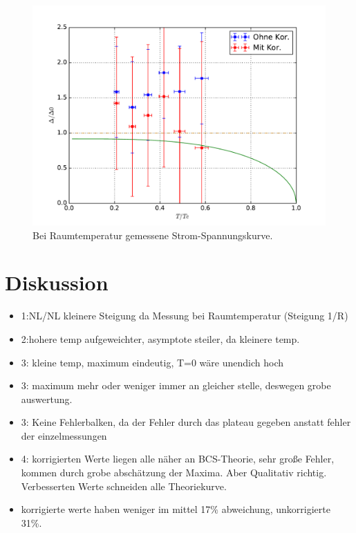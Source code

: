 \documentclass[twoside,        %
               BCOR12mm,       %
               english,ngerman, %
               fleqn,headsepline=false,footsepline=false
              ]{Vorlage/MFPREPORT}
\begin{document}
\begin{figure}[]
    \centering
    \includegraphics[width=\textwidth]{fig/4.pdf}
    \caption{Bei Raumtemperatur gemessene Strom-Spannungskurve.}
    \label{fig:4}
\end{figure}


\section{Diskussion}

\begin{itemize}
    \item 1:NL/NL kleinere Steigung da Messung bei Raumtemperatur (Steigung 1/R)
    \item 2:hohere temp aufgeweichter, asymptote steiler, da kleinere temp.
    \item 3: kleine temp, maximum eindeutig, T=0 wäre unendich hoch
    \item 3: maximum mehr oder weniger immer an gleicher stelle, deswegen grobe
        auswertung.
    \item 3: Keine Fehlerbalken, da der Fehler durch das plateau gegeben
        anstatt fehler der einzelmessungen
    \item 4: korrigierten Werte liegen alle näher an BCS-Theorie, sehr große
        Fehler, kommen durch grobe abschätzung der Maxima. Aber Qualitativ
        richtig. Verbesserten Werte schneiden alle Theoriekurve.
    \item korrigierte werte haben weniger im mittel 17\% abweichung,
        unkorrigierte 31\%.
\end{itemize}

\clearpage

%
%
%
%



\end{document}
